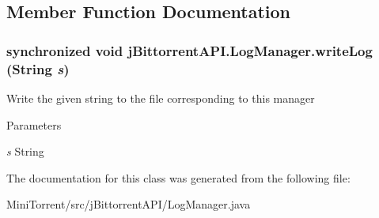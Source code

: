\subsection{Member Function Documentation}
\hypertarget{classj_bittorrent_a_p_i_1_1_log_manager_a09fe8776d05efb0fecc1dba36117e406}{
\subsubsection[{writeLog}]{\setlength{\rightskip}{0pt plus 5cm}synchronized void jBittorrentAPI.LogManager.writeLog (String {\em s})}}
\label{classj_bittorrent_a_p_i_1_1_log_manager_a09fe8776d05efb0fecc1dba36117e406}
Write the given string to the file corresponding to this manager 
\begin{DoxyParams}{Parameters}
\item[{\em s}]String \end{DoxyParams}


The documentation for this class was generated from the following file:\begin{DoxyCompactItemize}
\item 
MiniTorrent/src/jBittorrentAPI/LogManager.java\end{DoxyCompactItemize}

